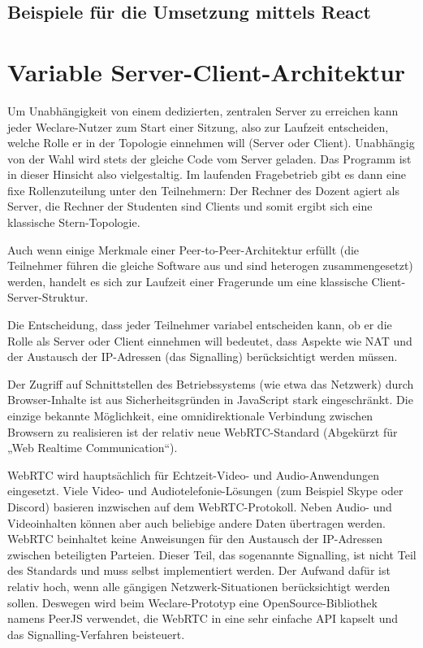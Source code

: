 \subsection{Beispiele für die Umsetzung mittels React}



%
\section{Variable Server-Client-Architektur}
\label{chap:p2p}
Um Unabhängigkeit von einem dedizierten, zentralen Server zu erreichen kann jeder Weclare-Nutzer zum Start einer Sitzung, also zur Laufzeit entscheiden, welche Rolle er in der Topologie einnehmen will (Server oder Client). Unabhängig von der Wahl wird stets der gleiche Code vom Server geladen. Das Programm ist in dieser Hinsicht also vielgestaltig. Im laufenden Fragebetrieb gibt es dann eine fixe Rollenzuteilung unter den Teilnehmern: Der Rechner des Dozent agiert als Server, die Rechner der Studenten sind Clients und somit ergibt sich eine klassische Stern-Topologie.

Auch wenn einige Merkmale einer Peer-to-Peer-Architektur erfüllt (die Teilnehmer führen die gleiche Software aus und sind heterogen zusammengesetzt) werden, handelt es sich zur Laufzeit einer Fragerunde um eine klassische Client-Server-Struktur.

Die Entscheidung, dass jeder Teilnehmer variabel entscheiden kann, ob er die Rolle als Server oder Client einnehmen will bedeutet, dass Aspekte wie NAT und der Austausch der IP-Adressen (das Signalling) berücksichtigt werden müssen.

Der Zugriff auf Schnittstellen des Betriebssystems (wie etwa das Netzwerk) durch Browser-Inhalte ist aus Sicherheitsgründen in JavaScript stark eingeschränkt. Die einzige bekannte Möglichkeit, eine omnidirektionale Verbindung zwischen Browsern zu realisieren ist der relativ neue WebRTC-Standard (Abgekürzt für „Web Realtime Communication“).

WebRTC wird hauptsächlich für Echtzeit-Video- und Audio-Anwendungen eingesetzt. Viele Video- und Audiotelefonie-Lösungen (zum Beispiel Skype oder Discord) basieren inzwischen auf dem WebRTC-Protokoll. Neben Audio- und Videoinhalten können aber auch beliebige andere Daten übertragen werden. WebRTC beinhaltet keine Anweisungen für den Austausch der IP-Adressen zwischen beteiligten Parteien. Dieser Teil, das sogenannte Signalling, ist nicht Teil des Standards und muss selbst implementiert werden. Der Aufwand dafür ist relativ hoch, wenn alle gängigen Netzwerk-Situationen berücksichtigt werden sollen. Deswegen wird beim Weclare-Prototyp eine OpenSource-Bibliothek namens PeerJS verwendet, die WebRTC in eine sehr einfache API kapselt und das Signalling-Verfahren beisteuert.

